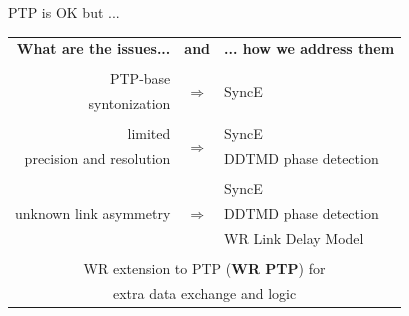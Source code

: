 \documentclass[compress,red]{beamer}
\begin{document}
\begin{frame}{PTP is OK but ...}

  \resizebox{11cm}{!} 
  {
    \begin{tabular}{ r c l }
  {\bf What are the issues...} 	& {\bf and}      & {\bf ... how we address them}  \\
				&     		 &        \\
      PTP-base		 	& \multirow{2}{*}{$\Rightarrow$}  & \multirow{2}{*}{SyncE }\\
      syntonization	        &      		 &        \\
				&      		 &        			\\
      limited             	&\multirow{2}{*}{$\Rightarrow$}  	 & SyncE \\
      precision and resolution  &      		 & DDTMD phase detection\\
				&    		 &        \\
			        &      		 & SyncE  \\
      unknown link asymmetry    & $\Rightarrow$  & DDTMD phase detection \\
				&      		 & WR Link Delay Model \\
				&      		 &        \\
      \multicolumn{3}{c}{WR extension to PTP ({\bf WR PTP}) for } \\
      \multicolumn{3}{c}{extra data exchange and logic} \\
    \end{tabular}
  }
\end{frame}
% 
% 
% 
% 
% 
\end{document}
